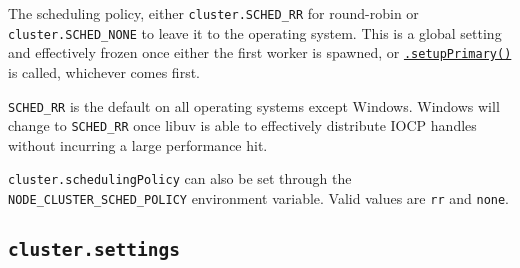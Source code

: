 The scheduling policy, either \texttt{cluster.SCHED\_RR} for round-robin
or \texttt{cluster.SCHED\_NONE} to leave it to the operating system.
This is a global setting and effectively frozen once either the first
worker is spawned, or
\hyperref[clustersetupprimarysettings]{\texttt{.setupPrimary()}} is
called, whichever comes first.

\texttt{SCHED\_RR} is the default on all operating systems except
Windows. Windows will change to \texttt{SCHED\_RR} once libuv is able to
effectively distribute IOCP handles without incurring a large
performance hit.

\texttt{cluster.schedulingPolicy} can also be set through the
\texttt{NODE\_CLUSTER\_SCHED\_POLICY} environment variable. Valid values
are \texttt{\textquotesingle{}rr\textquotesingle{}} and
\texttt{\textquotesingle{}none\textquotesingle{}}.

\subsection{\texorpdfstring{\texttt{cluster.settings}}{cluster.settings}}\label{cluster.settings}

